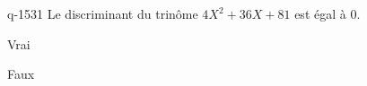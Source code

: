 \begin{truefalse}{q-1531}
Le discriminant du trinôme $4X^2+36X+81$ est égal à $0$.
\item* Vrai
\item Faux
\end{truefalse}

